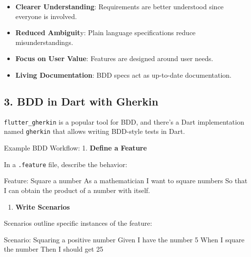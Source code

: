 \documentclass[
]{article}
\newenvironment{Shaded}{\begin{snugshade}}{\end{snugshade}}
\newcommand{\DecValTok}[1]{\textcolor[rgb]{0.96,0.45,0.00}{#1}}
\newcommand{\FunctionTok}[1]{\textcolor[rgb]{0.56,0.27,0.68}{#1}}
\newcommand{\NormalTok}[1]{\textcolor[rgb]{0.81,0.81,0.76}{#1}}
\providecommand{\tightlist}{%
  \setlength{\itemsep}{0pt}\setlength{\parskip}{0pt}}
\begin{document}
\begin{itemize}
\tightlist
\item
  \textbf{Clearer Understanding}: Requirements are better understood
  since everyone is involved.
\item
  \textbf{Reduced Ambiguit}y: Plain language specifications reduce
  misunderstandings.
\item
  \textbf{Focus on User Value}: Features are designed around user needs.
\item
  \textbf{Living Documentation}: BDD specs act as up-to-date
  documentation.
\end{itemize}

\subsection{3. BDD in Dart with Gherkin}\label{bdd-in-dart-with-gherkin}

\texttt{flutter\_gherkin} is a popular tool for BDD, and there's a Dart
implementation named \texttt{gherkin} that allows writing BDD-style
tests in Dart.

Example BDD Workflow: 1. \textbf{Define a Feature}

In a \texttt{.feature} file, describe the behavior:

\begin{Shaded}
\begin{Highlighting}[]
\NormalTok{Feature: Square a number}
\NormalTok{  As a mathematician}
\NormalTok{  I want to square numbers}
\NormalTok{  So that I can obtain the product of a number with itself.}
\end{Highlighting}
\end{Shaded}

\begin{enumerate}
\def\labelenumi{\arabic{enumi}.}
\setcounter{enumi}{1}
\tightlist
\item
  \textbf{Write Scenarios}
\end{enumerate}

Scenarios outline specific instances of the feature:

\begin{Shaded}
\begin{Highlighting}[]
\NormalTok{Scenario: Squaring }\FunctionTok{a} \FunctionTok{positive} \FunctionTok{number}
\NormalTok{  Given }\FunctionTok{I}\NormalTok{ have the }\FunctionTok{number} \DecValTok{5}
\NormalTok{  When }\FunctionTok{I} \FunctionTok{square}\NormalTok{ the }\FunctionTok{number}
\NormalTok{  Then }\FunctionTok{I}\NormalTok{ should }\FunctionTok{get} \DecValTok{25}
\end{Highlighting}
\end{Shaded}
\end{document}
